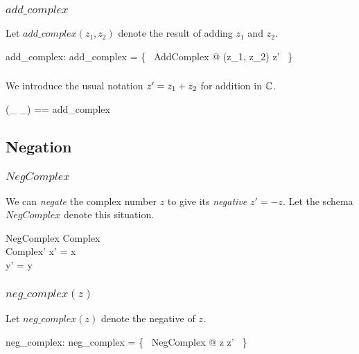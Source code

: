 \documentclass[11pt, oneside]{article}
\begin{document}
\subsubsection{$add\_complex$}

Let $add\_complex(z_1, z_2)$ denote the result of adding $z_1$ and $z_2$.

\begin{axdef}
	add\_complex: \C \cross \C \fun \C
\where
	add\_complex = \{~ AddComplex @ (z_1, z_2) \mapsto z' ~\}
\end{axdef}

\subsubsection{}

We introduce the usual notation $z' = z_1 \mathbin{+} z_2$ for addition in $\mathbb{C}$.

\begin{zed}
	(\_ \addC \_) == add\_complex
\end{zed}

\subsection{Negation}

\subsubsection{$NegComplex$}

We can \textit{negate} the complex number $z$ to give its \textit{negative} $z' = -z$.
Let the schema $NegComplex$ denote this situation.

\begin{schema}{NegComplex}
	Complex \\
	Complex'
\where
	x' = \negR x \\
	y' = \negR y
\end{schema}

\subsubsection{$neg\_complex(z)$}

Let $neg\_complex(z)$ denote the negative of $z$.

\begin{axdef}
	neg\_complex: \C \fun \C
\where
	neg\_complex = \{~ NegComplex @ z \mapsto z' ~\}
\end{axdef}
\end{document}
